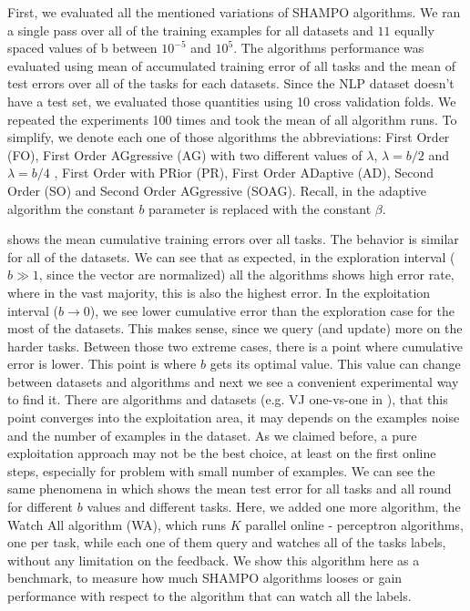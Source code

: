 First, we evaluated all the mentioned variations of SHAMPO algorithms. We ran a 
single pass over all of the training examples for all datasets and $11$ equally spaced values of b 
between $10^{-5}$ and $10^5$. The algorithms performance was evaluated using 
mean of accumulated training error of all tasks and the mean of test errors over 
all of the tasks for each datasets. Since the NLP dataset doesn't have a test 
set, we evaluated those quantities using 10 cross validation folds. We repeated 
the experiments 100 times and took the mean of all algorithm runs.
To simplify, we denote each one of those algorithms the  
abbreviations: First Order (FO), First Order AGgressive (AG) with two different values of $\lambda$, 
$\lambda = b/2$ and $\lambda = b/4$ , First Order with PRior (PR), First Order 
ADaptive (AD), Second Order (SO) and Second Order AGgressive (SOAG). 
Recall, in the adaptive algorithm the constant $b$ parameter is replaced with the constant 
$\beta$.

 shows the mean cumulative training errors over all tasks. The behavior is similar for 
all of the datasets. We can see that as expected, in the exploration interval ($b \gg 1$, since the vector are normalized) 
all the algorithms shows high error rate, where in the vast majority, this is 
also the highest error. In the exploitation interval ($b\rightarrow 0$), we  see 
lower cumulative error than the exploration case for the most of the datasets. 
This makes sense, since we query (and update) more on the harder tasks.
Between those two extreme cases, there is a point where cumulative error is 
lower. This point is where $b$ gets its optimal value. This value can change 
between datasets and algorithms and next we see a convenient experimental way to find it. 
There are algorithms and datasets (e.g. VJ one-vs-one in ), that this point converges
into the exploitation area, it may depends on the examples noise and the number of examples 
in the dataset. As we claimed before, a pure exploitation approach may not be the best choice, at least on 
the first online steps, especially for problem with small number of examples.
We can see the same phenomena in  which shows the mean 
test error for all tasks and all round for different $b$ values and different 
tasks. Here, we added one more algorithm, the Watch All algorithm (WA), which runs $K$ parallel online - 
perceptron algorithms, one per task, while each one of them query and watches all of the tasks labels, without any limitation on the feedback.
We show this algorithm here as a benchmark, to measure how much SHAMPO algorithms looses or gain 
performance with respect to the algorithm that can watch all the labels. 



